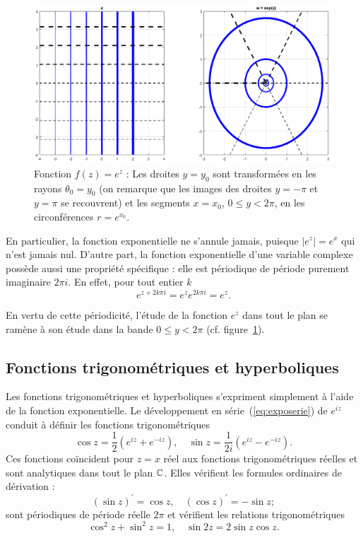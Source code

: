 \begin{figure}[hbt]
\begin{center}\includegraphics[scale=0.55]{images/complexexp3.png}
\end{center}
\caption{\small Fonction $f(z)=e^z$ : Les droites $y=y_0$ sont transformées en les rayons $\theta_0=y_0$ (on remarque que les images des droites $y=-\pi$ et $y=\pi$ se recouvrent) et les segments $x=x_0$, $0 \leq y < 2 \pi$, en les circonférences $r=e^{x_0}$.}\label{fig:expo}
\end{figure}
En particulier, la fonction exponentielle ne s'annule jamais, puisque $\lvert e^z\rvert = e^x$ qui n'est jamais nul. D'autre part, la fonction exponentielle d'une variable complexe possède aussi une propriété spécifique : elle est périodique de période purement imaginaire $2 \pi i$. En effet, pour tout entier $k$
\[e^{z + 2 k \pi i}=e^z e^{2 k \pi i}=e^z.\]

En vertu de cette périodicité, l'étude de la fonction $e^z$ dans tout le plan se ramène à son étude dans la bande $0 \leq y < 2 \pi$ (cf. figure~\ref{fig:expo}). 



\subsection{Fonctions trigonométriques et hyperboliques}
Les fonctions trigonométriques et hyperboliques s'expriment simplement à l'aide de la fonction exponentielle. Le développement en série~(\ref{eq:exposerie}) de $e^{i z}$ conduit à définir les fonctions trigonométriques
\[\cos z = \frac{1}{2}\left(e^{i z} + e^{-iz}\right), \quad \sin z=\frac{1}{2 i} \left(e^{i z} - e^{-iz}\right).\]
Ces fonctions coïncident pour $z=x$ réel aux fonctions trigonométriques réelles et sont analytiques dans tout le plan $\mathbb{C}$. Elles vérifient les formules ordinaires de dérivation :
\[(\sin z)^\prime=\cos z, \quad (\cos z)^\prime=-\sin z ;\]
sont périodiques de période réelle $2 \pi$ et vérifient les relations trigonométriques
\[\cos^2 z+\sin^2 z =1, \quad \sin 2 z = 2 \sin z \cos z.\]

